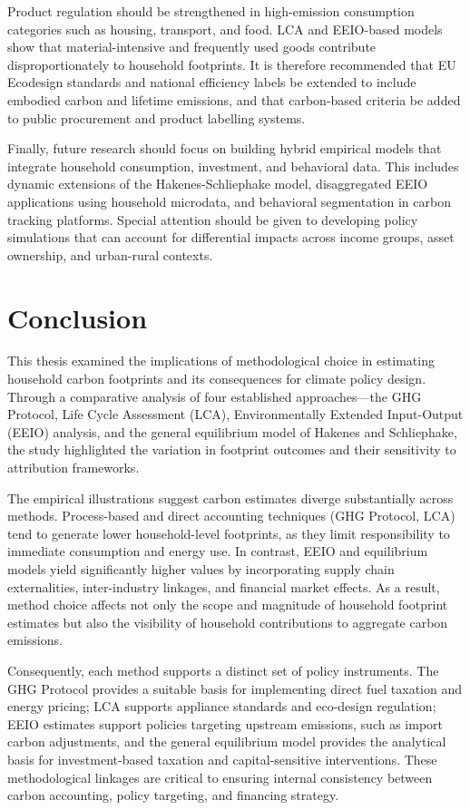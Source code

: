 \documentclass[12pt,a4paper]{article}%
\begin{document}
Product regulation should be strengthened in high-emission consumption categories such as housing, transport, and food. LCA and EEIO-based models show that material-intensive and frequently used goods contribute disproportionately to household footprints. It is therefore recommended that EU Ecodesign standards and national efficiency labels be extended to include embodied carbon and lifetime emissions, and that carbon-based criteria be added to public procurement and product labelling systems.

Finally, future research should focus on building hybrid empirical models that integrate household consumption, investment, and behavioral data. This includes dynamic extensions of the Hakenes-Schliephake model, disaggregated EEIO applications using household microdata, and behavioral segmentation in carbon tracking platforms. Special attention should be given to developing policy simulations that can account for differential impacts across income groups, asset ownership, and urban-rural contexts.

\section{Conclusion}

This thesis examined the implications of methodological choice in estimating household carbon footprints and its consequences for climate policy design. Through a comparative analysis of four established approaches—the GHG Protocol, Life Cycle Assessment (LCA), Environmentally Extended Input-Output (EEIO) analysis, and the general equilibrium model of Hakenes and Schliephake, the study highlighted the variation in footprint outcomes and their sensitivity to attribution frameworks.

The empirical illustrations suggest carbon estimates diverge substantially across methods. Process-based and direct accounting techniques (GHG Protocol, LCA) tend to generate lower household-level footprints, as they limit responsibility to immediate consumption and energy use. In contrast, EEIO and equilibrium models yield significantly higher values by incorporating supply chain externalities, inter-industry linkages, and financial market effects. As a result, method choice affects not only the scope and magnitude of household footprint estimates but also the visibility of household contributions to aggregate carbon emissions.

Consequently, each method supports a distinct set of policy instruments. The GHG Protocol provides a suitable basis for implementing direct fuel taxation and energy pricing; LCA supports appliance standards and eco-design regulation; EEIO estimates support policies targeting upstream emissions, such as import carbon adjustments, and the general equilibrium model provides the analytical basis for investment-based taxation and capital-sensitive interventions. These methodological linkages are critical to ensuring internal consistency between carbon accounting, policy targeting, and financing strategy.
\end{document}
